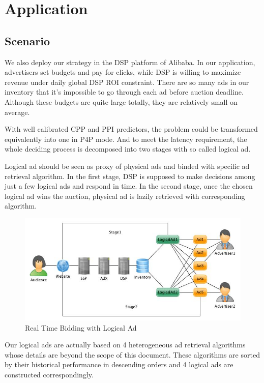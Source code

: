 \documentclass[sigconf]{acmart}
\begin{document}
\section{Application} \label{Application}

\subsection{Scenario}

We also deploy our strategy in the DSP platform of Alibaba.
In our application, advertisers set budgets and pay for clicks, while DSP is willing to maximize revenue under daily global DSP ROI constraint.
There are so many ads in our inventory that it's impossible to go through each ad before auction deadline.
Although these budgets are quite large totally, they are relatively small on average.

With well calibrated CPP and PPI predictors, the problem could be transformed equivalently into one in P4P mode.
And to meet the latency requirement, the whole deciding process is decomposed into two stages with so called logical ad.

Logical ad should be seen as proxy of physical ads and binded with specific ad retrieval algorithm.
In the first stage, DSP is supposed to make decisions among just a few logical ads and respond in time.
In the second stage, once the chosen logical ad wins the auction, physical ad is lazily retrieved with corresponding algorithm.

\begin{figure}[!h]
\centering
\includegraphics[width=1.0\linewidth]{./LogicalAd.jpg}
\caption{Real Time Bidding with Logical Ad}
\end{figure}

Our logical ads are actually based on 4 heterogeneous ad retrieval algorithms whose details are beyond the scope of this document.
These algorithms are sorted by their historical performance in descending orders and 4 logical ads are constructed correspondingly.
\end{document}
